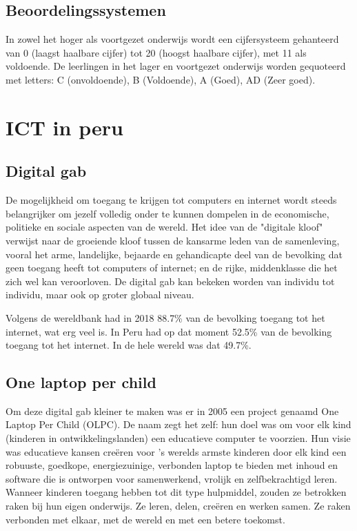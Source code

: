 \subsection{Beoordelingssystemen}
In zowel het hoger als voortgezet onderwijs wordt een cijfersysteem gehanteerd van 0 (laagst haalbare cijfer) tot 20 (hoogst haalbare cijfer), met 11 als voldoende. De leerlingen in het lager en voortgezet onderwijs worden gequoteerd met letters: C (onvoldoende), B (Voldoende), A (Goed), AD (Zeer goed). \autocite{Nuffic2015}

\section{ICT in peru}
\subsection{Digital gab}
De mogelijkheid om toegang te krijgen tot computers en internet wordt steeds belangrijker om jezelf volledig onder te kunnen dompelen in de economische, politieke en sociale aspecten van de wereld. Het idee van de "digitale kloof" verwijst naar de groeiende kloof tussen de kansarme leden van de samenleving, vooral het arme, landelijke, bejaarde en gehandicapte deel van de bevolking dat geen toegang heeft tot computers of internet; en de rijke, middenklasse die het zich wel kan veroorloven. De digital gab kan bekeken worden van individu tot individu, maar ook op groter globaal niveau. \autocite{Marichick2000}

Volgens de wereldbank had in 2018 88.7\% van de bevolking toegang tot het internet, wat erg veel is. In Peru had op dat moment 52.5\% van de bevolking toegang tot het internet. In de hele wereld was dat 49.7\%. \autocite{WereldBank2018}

\subsection{One laptop per child}
Om deze digital gab kleiner te maken was er in 2005 een project genaamd One Laptop Per Child (OLPC). De naam zegt het zelf: hun doel was om voor elk kind (kinderen in ontwikkelingslanden) een educatieve computer te voorzien. Hun visie was educatieve kansen creëren voor 's werelds armste kinderen door elk kind een robuuste, goedkope, energiezuinige, verbonden laptop te bieden met inhoud en software die is ontworpen voor samenwerkend, vrolijk en zelfbekrachtigd leren. Wanneer kinderen toegang hebben tot dit type hulpmiddel, zouden ze betrokken raken bij hun eigen onderwijs. Ze leren, delen, creëren en werken samen. Ze raken verbonden met elkaar, met de wereld en met een betere toekomst. \autocite{OneLaptopPerChild2005}

